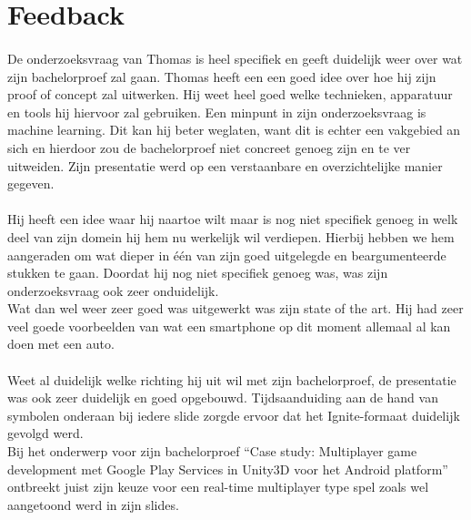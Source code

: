 \documentclass[fleqn,10pt]{voorstel}
\begin{document}
\section{Feedback}

\paragraph{\cite{VanSevenant2016}}
De onderzoeksvraag van Thomas is heel specifiek en geeft duidelijk weer over wat zijn bachelorproef zal gaan. Thomas heeft een een goed idee over hoe hij zijn proof of concept zal uitwerken. Hij weet heel goed welke technieken, apparatuur en tools hij hiervoor zal gebruiken. Een minpunt in zijn onderzoeksvraag is machine learning. Dit kan hij beter weglaten, want dit is echter een vakgebied an sich en hierdoor zou de bachelorproef niet concreet genoeg zijn en te ver uitweiden. Zijn presentatie werd op een verstaanbare en overzichtelijke manier gegeven.

\paragraph{\cite{Willems2016}}
Hij heeft een idee waar hij naartoe wilt maar is nog niet specifiek genoeg in welk deel van zijn domein hij hem nu werkelijk wil verdiepen. Hierbij hebben we hem aangeraden om wat dieper in één van zijn goed uitgelegde en beargumenteerde stukken te gaan. Doordat hij nog niet specifiek genoeg was, was zijn onderzoeksvraag ook zeer onduidelijk.\\
Wat dan wel weer zeer goed was uitgewerkt was zijn state of the art. Hij had zeer veel goede voorbeelden van wat een smartphone op dit moment allemaal al kan doen met een auto.

\paragraph{\cite{Pinsard2016}}
Weet al duidelijk welke richting hij uit wil met zijn bachelorproef, de presentatie was ook zeer duidelijk en goed opgebouwd. Tijdsaanduiding aan de hand van symbolen onderaan bij iedere slide zorgde ervoor dat het Ignite-formaat duidelijk gevolgd werd.\\
Bij het onderwerp voor zijn bachelorproef “Case study: Multiplayer game development met Google Play Services in Unity3D voor het Android platform” ontbreekt juist zijn keuze voor een real-time multiplayer type spel zoals wel aangetoond werd in zijn slides.
\end{document}
